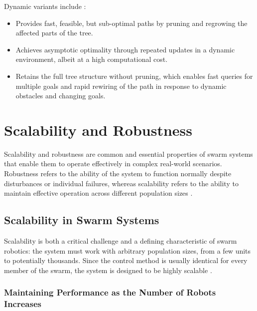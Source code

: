Dynamic variants include \cite{chen2025survey}:
\begin{itemize}
  \item {} Provides fast, feasible, but sub-optimal paths by pruning and
        regrowing the affected parts of the tree.
  \item {} Achieves asymptotic optimality through repeated
        updates in a dynamic environment, albeit at a high computational cost.
  \item {} Retains the full tree structure without pruning, which
        enables fast queries for multiple goals and rapid rewiring of the path in
        response to dynamic obstacles and changing goals.
\end{itemize}

\section{Scalability and Robustness}\label{sec:scalability}

Scalability and robustness are common and essential properties of swarm systems
that enable them to operate effectively in complex real-world scenarios.
Robustness refers to the ability of the system to function normally despite
disturbances or individual failures, whereas scalability refers to the ability
to maintain effective operation across different population sizes
\cite{dias2021swarm,brambilla2013swarm}.

\subsection{Scalability in Swarm Systems}

Scalability is both a critical challenge and a defining characteristic of swarm
robotics: the system must work with arbitrary population sizes, from a few units
to potentially thousands. Since the control method is usually identical for every
member of the swarm, the system is designed to be highly scalable
\cite{dias2021swarm,tan2013research}.

\subsubsection{Maintaining Performance as the Number of Robots Increases}

